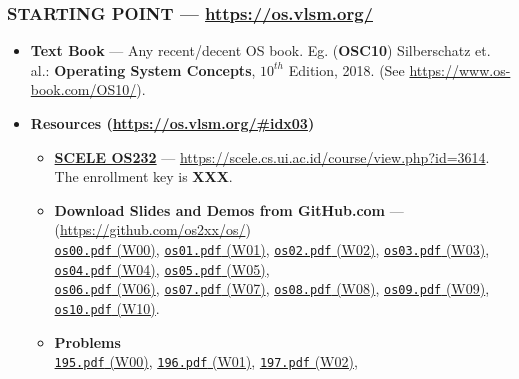 \begin{frame}[fragile]
\frametitle{\textbf{STARTING POINT} --- 
{
\hypersetup{colorlinks,linkcolor=,urlcolor=links}
\url{https://os.vlsm.org/}
}
}
\begin{itemize}
\item[$\square$] \textbf{Text Book} ---
                 Any recent/decent OS book. Eg. (\textbf{OSC10}) Silberschatz et. al.: 
                 \textbf{Operating System Concepts}, $10^{th}$ Edition, 2018.
                 (See \url{https://www.os-book.com/OS10/}).
\item[$\square$] \textbf{Resources ({\footnotesize \url{https://os.vlsm.org/\#idx03}})}
\begin{itemize}
\item[$\square$] \href{https://scele.cs.ui.ac.id/course/view.php?id=3614}{\textbf{SCELE OS232}} ---
\url{https://scele.cs.ui.ac.id/course/view.php?id=3614}.\\
The enrollment key is \textbf{XXX}.
\item[$\square$] \textbf{Download Slides and Demos from GitHub.com} --- (\url{https://github.com/os2xx/os/})\\
                 {\scriptsize%
                 \href{https://os.vlsm.org/Slides/os00.pdf}{\texttt{os00.pdf} (W00)},
                 \href{https://os.vlsm.org/Slides/os01.pdf}{\texttt{os01.pdf} (W01)},
                 \href{https://os.vlsm.org/Slides/os02.pdf}{\texttt{os02.pdf} (W02)},
                 \href{https://os.vlsm.org/Slides/os03.pdf}{\texttt{os03.pdf} (W03)},
                 \href{https://os.vlsm.org/Slides/os04.pdf}{\texttt{os04.pdf} (W04)},
                 \href{https://os.vlsm.org/Slides/os05.pdf}{\texttt{os05.pdf} (W05)},\\
                 \href{https://os.vlsm.org/Slides/os06.pdf}{\texttt{os06.pdf} (W06)},
                 \href{https://os.vlsm.org/Slides/os07.pdf}{\texttt{os07.pdf} (W07)},
                 \href{https://os.vlsm.org/Slides/os08.pdf}{\texttt{os08.pdf} (W08)},
                 \href{https://os.vlsm.org/Slides/os09.pdf}{\texttt{os09.pdf} (W09)},
                 \href{https://os.vlsm.org/Slides/os10.pdf}{\texttt{os10.pdf} (W10)}.
                 }
\item[$\square$] \textbf{Problems}\\
                 {\scriptsize%
                 \href{https://rms46.vlsm.org/2/195.pdf}{\texttt{195.pdf} (W00)},
                 \href{https://rms46.vlsm.org/2/196.pdf}{\texttt{196.pdf} (W01)},
                 \href{https://rms46.vlsm.org/2/197.pdf}{\texttt{197.pdf} (W02)},
}
\end{itemize}
\end{itemize}
\end{frame}
